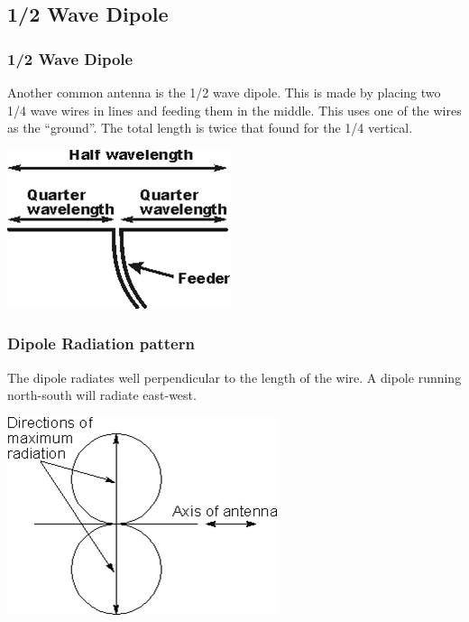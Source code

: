 \documentclass[10pt]{beamer}
\begin{document}
\subsection{1/2 Wave Dipole}

\begin{frame}
\frametitle{1/2 Wave Dipole}
Another common antenna is the 1/2 wave dipole. This is made by placing two 1/4 wave wires in lines and feeding them in the middle. This uses one of the wires as the ``ground''. The total length is twice that found for the 1/4 vertical.
\begin{center}
\includegraphics[height=.5\textheight]{hwavedipole.png}
\end{center}
\end{frame}

\begin{frame}
\frametitle{Dipole Radiation pattern}
The dipole radiates well perpendicular to the length of the wire. A dipole running north-south will radiate east-west.
\begin{center}
\includegraphics[height=.5\textheight]{hwavedipolerad.png}
\end{center}
\end{frame}
\end{document}
